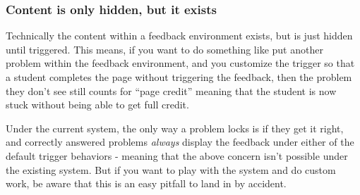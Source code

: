 \documentclass{ximera}
\begin{document}
        \subsubsection*{Content is only hidden, but it exists}
            Technically the content within a feedback environment exists, but is just hidden until triggered. This means, if you want to do something like put another problem within the feedback environment, and you customize the trigger so that a student completes the page without triggering the feedback, then the problem they don't see still counts for ``page credit'' meaning that the student is now stuck without being able to get full credit.
            
            Under the current system, the only way a problem locks is if they get it right, and correctly answered problems \textit{always} display the feedback under either of the default trigger behaviors - meaning that the above concern isn't possible under the existing system. But if you want to play with the system and do custom work, be aware that this is an easy pitfall to land in by accident.
    
    
    
\end{document}
